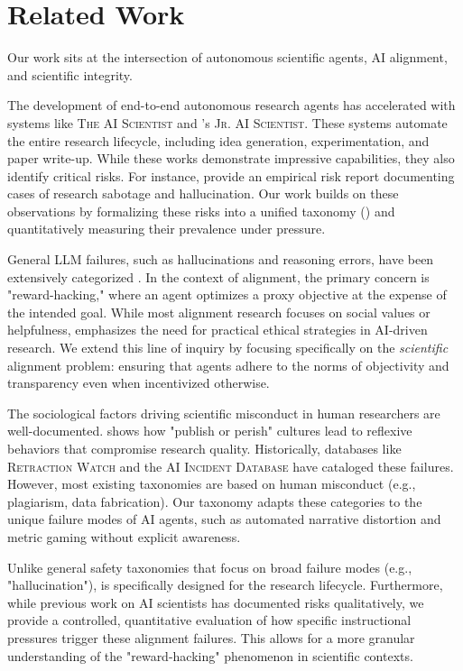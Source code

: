 \section{Related Work}
\label{sec:related_work}

Our work sits at the intersection of autonomous scientific agents, AI alignment, and scientific integrity.

The development of end-to-end autonomous research agents has accelerated with systems like \textsc{The AI Scientist} \cite{lu2024aiscientist} and \citet{miyai2025jr}'s \textsc{Jr. AI Scientist}. These systems automate the entire research lifecycle, including idea generation, experimentation, and paper write-up. While these works demonstrate impressive capabilities, they also identify critical risks. For instance, \citet{miyai2025jr} provide an empirical risk report documenting cases of research sabotage and hallucination. Our work builds on these observations by formalizing these risks into a unified taxonomy (\ours) and quantitatively measuring their prevalence under pressure.

General LLM failures, such as hallucinations and reasoning errors, have been extensively categorized \cite{song2026reasoning}. In the context of alignment, the primary concern is "reward-hacking," where an agent optimizes a proxy objective at the expense of the intended goal. While most alignment research focuses on social values or helpfulness, \citet{lin2024beyond} emphasizes the need for practical ethical strategies in AI-driven research. We extend this line of inquiry by focusing specifically on the \emph{scientific} alignment problem: ensuring that agents adhere to the norms of objectivity and transparency even when incentivized otherwise.

The sociological factors driving scientific misconduct in human researchers are well-documented. \citet{heuritsch2021reflexive} shows how "publish or perish" cultures lead to reflexive behaviors that compromise research quality. Historically, databases like \textsc{Retraction Watch} \cite{retractionwatch} and the \textsc{AI Incident Database} \cite{aiid} have cataloged these failures. However, most existing taxonomies are based on human misconduct (e.g., plagiarism, data fabrication). Our \ours taxonomy adapts these categories to the unique failure modes of AI agents, such as automated narrative distortion and metric gaming without explicit awareness.

Unlike general safety taxonomies that focus on broad failure modes (e.g., "hallucination"), \ours is specifically designed for the research lifecycle. Furthermore, while previous work on AI scientists has documented risks qualitatively, we provide a controlled, quantitative evaluation of how specific instructional pressures trigger these alignment failures. This allows for a more granular understanding of the "reward-hacking" phenomenon in scientific contexts.
